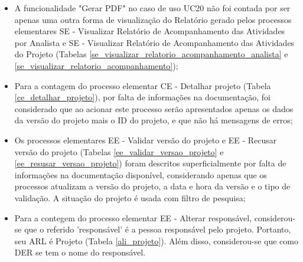 \begin{itemize}
   \item A funcionalidade "Gerar PDF" no caso de uso UC20 não foi contada por ser apenas uma outra forma de visualização do Relatório gerado
     pelos processos elementares SE - Visualizar Relatório de Acompanhamento das Atividades por Analista e 
     SE - Visualizar Relatório de Acompanhamento das Atividades do Projeto
     (Tabelas \ref{se_visualizar_relatorio_acompanhamento_analista} e \ref{se_visualizar_relatorio_acompanhamento});
     
   \item Para a contagem do processo elementar CE - Detalhar projeto (Tabela \ref{ce_detalhar_projeto}), por falta de informações na documentação,
     foi considerado que ao acionar este processo serão apresentados apenas os dados da versão do projeto mais o ID do projeto, e que não há 
     mensagens de erros;
     
   \item Os processos elementares EE - Validar versão do projeto e EE - Recusar versão do projeto 
    (Tabelas \ref{ee_validar_versao_projeto} e \ref{ee_resusar_versao_projeto}) foram descritos superficialmente por falta de informações
    na documentação disponível, considerando apenas que os processos atualizam a versão do projeto, a data e hora da versão e o tipo 
    de validação. A situação do projeto é usada com filtro de pesquisa;
    
   \item Para a contegem do processo elementar EE - Alterar responsável, considerou-se que o referido 'responsável' é a pessoa
   responsável pelo projeto. Portanto, seu ARL é Projeto (Tabela \ref{ali_projeto}). Além disso, considerou-se que como DER se tem o 
   nome do responsável.
   
  \end{itemize}

